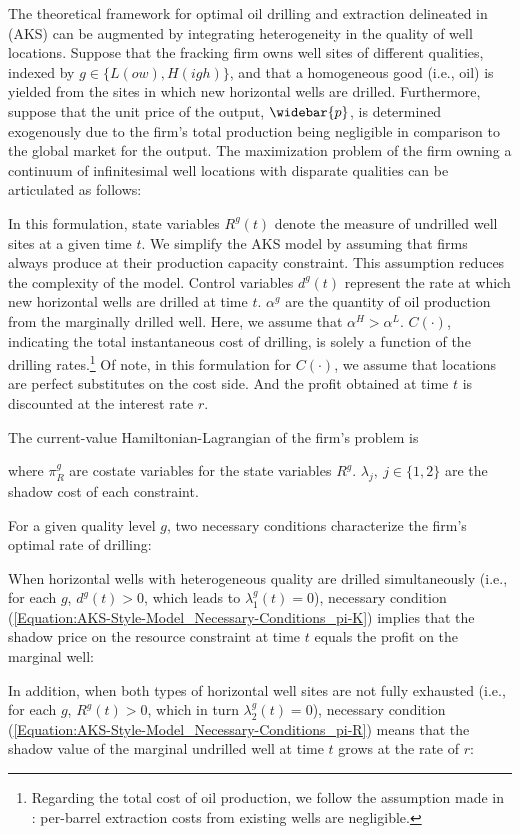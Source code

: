 The theoretical framework for optimal oil drilling and extraction delineated in \cite{Hotelling-under-Pressure_AKS_2018} (AKS) can be augmented by integrating heterogeneity in the quality of well locations. Suppose that the fracking firm owns well sites of different qualities, indexed by $g \in \{L(ow), H(igh)\}$, and that a homogeneous good (i.e., oil) is yielded from the sites in which new horizontal wells are drilled. Furthermore, suppose that the unit price of the output, $\widebar{p}$, is determined exogenously due to the firm's total production being negligible in comparison to the global market for the output. The maximization problem of the firm owning a continuum of infinitesimal well locations with disparate qualities can be articulated as follows:

In this formulation, state variables $R^{g}(t)$ denote the measure of undrilled well sites at a given time $t$. We simplify the AKS model by assuming that firms always produce at their production capacity constraint. This assumption reduces the complexity of the model. Control variables $d^{g}(t)$ represent the rate at which new horizontal wells are drilled at time $t$. $\alpha^{g}$ are the quantity of oil production from the marginally drilled well. Here, we assume that $\alpha^{H} > \alpha^{L}$. $C(\cdot)$, indicating the total instantaneous cost of drilling, is solely a function of the drilling rates.\footnote{Regarding the total cost of oil production, we follow the assumption made in \cite{Hotelling-under-Pressure_AKS_2018}: per-barrel extraction costs from existing wells are negligible.} Of note, in this formulation for $C(\cdot)$, we assume that locations are perfect substitutes on the cost side. And the profit obtained at time $t$ is discounted at the interest rate $r$.  

The current-value Hamiltonian-Lagrangian of the firm's problem is

where $\pi^{g}_{R}$ are costate variables for the state variables $R^{g}$. $\lambda_{j}, \ j \in \{1, 2\}$ are the shadow cost of each constraint.

For a given quality level $g$, two necessary conditions characterize the firm's optimal rate of drilling:

When horizontal wells with heterogeneous quality are drilled simultaneously (i.e., for each $g$, $d^{g}(t) >0$, which leads to $\lambda_{1}^{g}(t) = 0$), necessary condition (\ref{Equation:AKS-Style-Model_Necessary-Conditions_pi-K}) implies that the shadow price on the resource constraint at time $t$ equals the profit on the marginal well:

In addition, when both types of horizontal well sites are not fully exhausted (i.e., for each $g$, $R^{g}(t) > 0$, which in turn $\lambda_{2}^{g}(t) = 0$), necessary condition (\ref{Equation:AKS-Style-Model_Necessary-Conditions_pi-R}) means that the shadow value of the marginal undrilled well at time $t$ grows at the rate of $r$:


